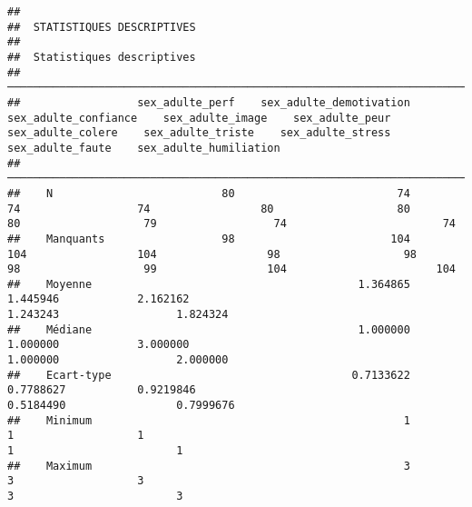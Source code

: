 \documentclass[
]{article}
\begin{document}
\begin{verbatim}
## 
##  STATISTIQUES DESCRIPTIVES
## 
##  Statistiques descriptives                                                                                                                                                                                                                
##  ──────────────────────────────────────────────────────────────────────────────────────────────────────────────────────────────────────────────────────────────────────────────────────────────────────────────────────────────────────── 
##                  sex_adulte_perf    sex_adulte_demotivation    sex_adulte_confiance    sex_adulte_image    sex_adulte_peur    sex_adulte_colere    sex_adulte_triste    sex_adulte_stress    sex_adulte_faute    sex_adulte_humiliation   
##  ──────────────────────────────────────────────────────────────────────────────────────────────────────────────────────────────────────────────────────────────────────────────────────────────────────────────────────────────────────── 
##    N                          80                         74                      74                  74                 80                   80                   80                   79                  74                        74   
##    Manquants                  98                        104                     104                 104                 98                   98                   98                   99                 104                       104   
##    Moyenne                                         1.364865                1.445946            2.162162                                                                                              1.243243                  1.824324   
##    Médiane                                         1.000000                1.000000            3.000000                                                                                              1.000000                  2.000000   
##    Ecart-type                                     0.7133622               0.7788627           0.9219846                                                                                             0.5184490                 0.7999676   
##    Minimum                                                1                       1                   1                                                                                                     1                         1   
##    Maximum                                                3                       3                   3                                                                                                     3                         3   

\end{verbatim}
\end{document}

